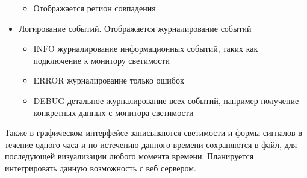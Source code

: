 \begin{itemize}
\begin{itemize}
    \item Отображается регион совпадения.
  \end{itemize}
  \item Логирование событий. Отображается журналирование событий
    \begin{itemize}
      \item INFO журналирование информационных событий, таких как подключение к монитору светимости
      \item ERROR журналирование только ошибок
      \item DEBUG детальное журналирование всех событий, например получение конкретных данных с монитора светимости
    \end{itemize}
\end{itemize}\par
  Также в графическом интерфейсе записываются светимости и формы сигналов в течение одного часа и по истечению данного времени сохраняются в файл, для последующей визуализации любого момента времени. Планируется интегрировать данную возможность с веб сервером.
